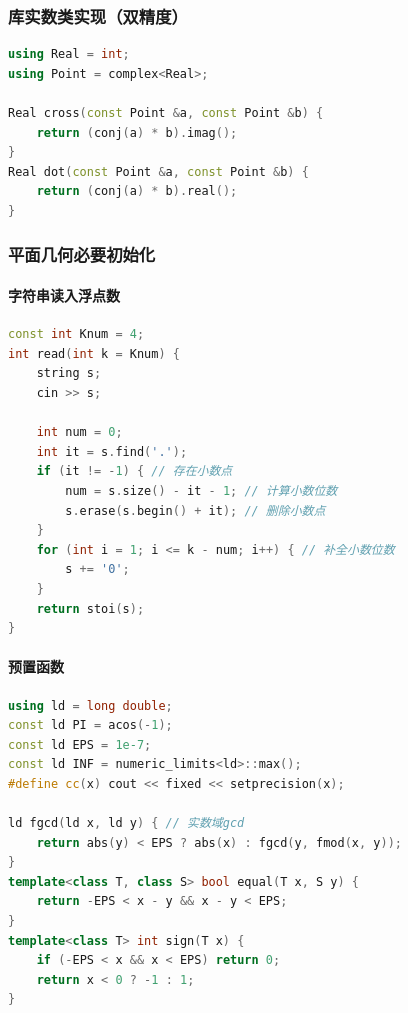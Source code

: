 \hypertarget{ux5e93ux5b9eux6570ux7c7bux5b9eux73b0ux53ccux7cbeux5ea6}{%
\subsubsection{库实数类实现（双精度）}\label{ux5e93ux5b9eux6570ux7c7bux5b9eux73b0ux53ccux7cbeux5ea6}}

\begin{lstlisting}[language={C++}]
using Real = int;
using Point = complex<Real>;
 
Real cross(const Point &a, const Point &b) {
    return (conj(a) * b).imag();
} 
Real dot(const Point &a, const Point &b) {
    return (conj(a) * b).real();
}
\end{lstlisting}

\hypertarget{ux5e73ux9762ux51e0ux4f55ux5fc5ux8981ux521dux59cbux5316}{%
\subsubsection{平面几何必要初始化}\label{ux5e73ux9762ux51e0ux4f55ux5fc5ux8981ux521dux59cbux5316}}

\hypertarget{ux5b57ux7b26ux4e32ux8bfbux5165ux6d6eux70b9ux6570}{%
\paragraph{字符串读入浮点数}\label{ux5b57ux7b26ux4e32ux8bfbux5165ux6d6eux70b9ux6570}}

\begin{lstlisting}[language={C++}]
const int Knum = 4;
int read(int k = Knum) {
    string s;
    cin >> s;
    
    int num = 0;
    int it = s.find('.');
    if (it != -1) { // 存在小数点
        num = s.size() - it - 1; // 计算小数位数
        s.erase(s.begin() + it); // 删除小数点
    }
    for (int i = 1; i <= k - num; i++) { // 补全小数位数
        s += '0';
    }
    return stoi(s); 
}
\end{lstlisting}

\hypertarget{ux9884ux7f6eux51fdux6570}{%
\paragraph{预置函数}\label{ux9884ux7f6eux51fdux6570}}

\begin{lstlisting}[language={C++}]
using ld = long double;
const ld PI = acos(-1);
const ld EPS = 1e-7;
const ld INF = numeric_limits<ld>::max();
#define cc(x) cout << fixed << setprecision(x);

ld fgcd(ld x, ld y) { // 实数域gcd
    return abs(y) < EPS ? abs(x) : fgcd(y, fmod(x, y));
}
template<class T, class S> bool equal(T x, S y) {
    return -EPS < x - y && x - y < EPS;
}
template<class T> int sign(T x) {
    if (-EPS < x && x < EPS) return 0;
    return x < 0 ? -1 : 1;
}
\end{lstlisting}

